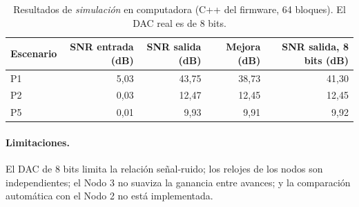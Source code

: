 \begin{table}[ht]
  \centering
  \caption{Resultados de \emph{simulaci\'on} en computadora (C++ del firmware, 64 bloques). El DAC real es de 8 bits.}
  \begin{tabular}{lrrrr}
    \toprule
    Escenario & SNR entrada (dB) & SNR salida (dB) & Mejora (dB) & SNR salida, 8 bits (dB) \\
    \midrule
    P1 & 5,03 & 43,75 & 38,73 & 41,30 \\
    P2 & 0,03 & 12,47 & 12,45 & 12,45 \\
    P5 & 0,01 &  9,93 &  9,91 &  9,92 \\
    \bottomrule
  \end{tabular}
\end{table}

\paragraph{Limitaciones.}
El DAC de 8 bits limita la relaci\'on se\~nal-ruido; los relojes de los nodos son independientes; el Nodo 3 no suaviza la ganancia
entre avances; y la comparaci\'on autom\'atica con el Nodo 2 no est\'a implementada.
